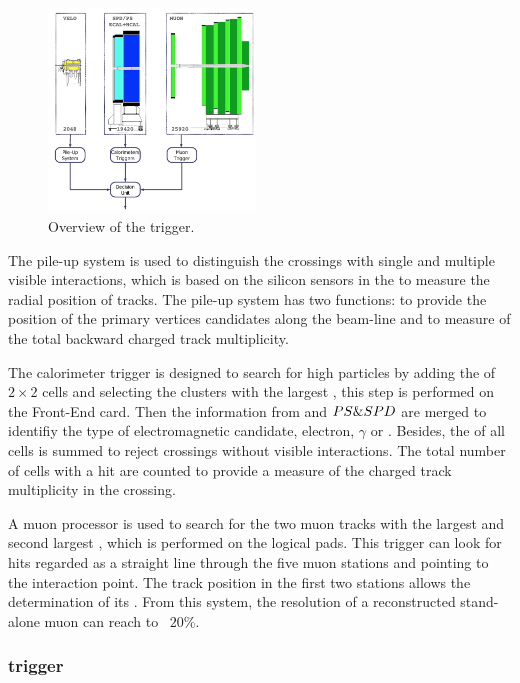 \begin{figure}[!hbtp]
\centering
\includegraphics[width=0.49\textwidth]{Figures/02_Detector/L0_trigger}%
\caption{ Overview of the \lone trigger\supercite{LHCb-DP-2008-001}.}
\label{fig:L0_trigger}
\end{figure}

The pile-up system is used to distinguish the crossings with single and multiple visible interactions, 
which is based on the silicon sensors in the \velo to measure the radial position of tracks. 
The pile-up system has two functions: 
to provide the position of the primary vertices candidates along the beam-line 
and to measure of the total backward charged track multiplicity.


The calorimeter trigger is designed to search for high \et particles by adding the \et of $2\times2$ cells and selecting the clusters 
with the largest \et,
this step is performed on the Front-End card.
Then the information from \ecal and $PS \& SPD$ are merged to identifiy the type of electromagnetic candidate, electron, $\gamma$ or \piz.
Besides,
the \et of all \hcal cells is summed to reject crossings without visible interactions. 
The total number of \spd cells with a hit are counted to provide a measure of the charged track multiplicity in the crossing.

A \lone muon processor is used to search for the two muon tracks with the largest and second largest \pt,
which is performed on the logical pads.
This trigger can look for hits regarded as a straight line through the five muon stations and pointing to the interaction point.
The track position in the first two stations allows the determination of its \pt.
From this system, 
the \pt resolution of a reconstructed stand-alone muon can reach to ~$20\%$.


\subsubsection{\hltone trigger}


